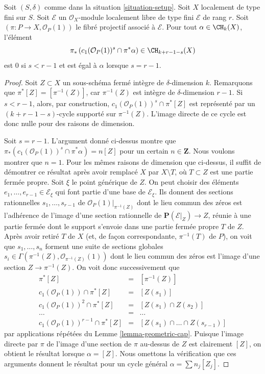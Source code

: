 \begin{lemma}
\label{lemma-cap-projective-bundle}
Soit $(S, \delta)$ comme dans la situation \ref{situation-setup}.
Soit $X$ localement de type fini sur $S$.
Soit $\mathcal{E}$ un $\mathcal{O}_X$-module localement libre de type fini
$\mathcal{E}$ de rang $r$. Soit $(\pi : P \to X, \mathcal{O}_P(1))$
le fibré projectif associé à $\mathcal{E}$.
Pour tout $\alpha \in \CH_k(X)$, l'élément
$$
\pi_*\left(
c_1(\mathcal{O}_P(1))^s \cap \pi^*\alpha
\right)
\in
\CH_{k + r - 1 - s}(X)
$$
est $0$ si $s < r - 1$ et est égal à $\alpha$ lorsque $s = r - 1$.
\end{lemma}

\begin{proof}
Soit $Z \subset X$ un sous-schéma fermé intègre de $\delta$-dimension $k$.
Remarquons que $\pi^*[Z] = [\pi^{-1}(Z)]$, car $\pi^{-1}(Z)$ est intègre de
$\delta$-dimension $r - 1$.
Si $s < r - 1$, alors, par construction,
$c_1(\mathcal{O}_P(1))^s \cap \pi^*[Z]$
est représenté par un $(k + r - 1 - s)$-cycle supporté sur
$\pi^{-1}(Z)$. L'image directe de ce cycle
est donc nulle pour des raisons de dimension.

\medskip\noindent
Soit $s = r - 1$. L'argument donné ci-dessus montre que
$\pi_*(c_1(\mathcal{O}_P(1))^s \cap \pi^*\alpha) = n [Z]$
pour un certain $n \in \mathbf{Z}$. Nous voulons montrer que $n = 1$.
Pour les mêmes raisons de dimension
que ci-dessus, il suffit de démontrer ce résultat après avoir remplacé $X$ par
$X \setminus T$, où $T \subset Z$ est une partie fermée propre.
Soit $\xi$ le point générique de $Z$.
On peut choisir des éléments $e_1, \ldots, e_{r - 1} \in \mathcal{E}_\xi$
qui font partie d'une base de $\mathcal{E}_\xi$.
Ils donnent des sections rationnelles $s_1, \ldots, s_{r - 1}$
de $\mathcal{O}_P(1)|_{\pi^{-1}(Z)}$ dont le lieu commun des zéros
est l'adhérence de l'image d'une section rationnelle de
$\mathbf{P}(\mathcal{E}|_Z) \to Z$, réunie à une partie fermée dont le
support s'envoie dans une partie fermée propre $T$ de $Z$.
Après avoir retiré $T$ de $X$ (et, de façon correspondante, $\pi^{-1}(T)$
de $P$), on voit que $s_1, \ldots, s_n$ forment une suite
de sections globales
$s_i \in \Gamma(\pi^{-1}(Z), \mathcal{O}_{\pi^{-1}(Z)}(1))$
dont le lieu commun des zéros est l'image d'une section $Z \to \pi^{-1}(Z)$.
On voit donc successivement que
\begin{eqnarray*}
\pi^*[Z] & = & [\pi^{-1}(Z)] \\
c_1(\mathcal{O}_P(1)) \cap \pi^*[Z] & = & [Z(s_1)] \\
c_1(\mathcal{O}_P(1))^2 \cap \pi^*[Z] & = & [Z(s_1) \cap Z(s_2)] \\
\ldots & = & \ldots \\
c_1(\mathcal{O}_P(1))^{r - 1} \cap \pi^*[Z] & = &
[Z(s_1) \cap \ldots \cap Z(s_{r - 1})]
\end{eqnarray*}
par applications répétées du Lemme \ref{lemma-geometric-cap}.
Puisque l'image directe par $\pi$ de l'image d'une
section de $\pi$ au-dessus de $Z$ est clairement $[Z]$, on obtient le résultat
lorsque $\alpha = [Z]$. Nous omettons la vérification que ces
arguments donnent le résultat pour un cycle général $\alpha = \sum n_j [Z_j]$.
\end{proof}

